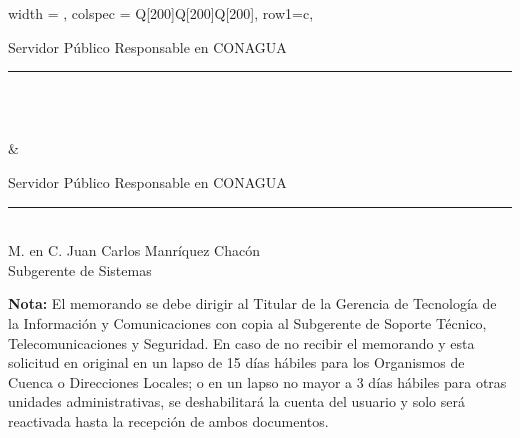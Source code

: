 \documentclass[letterpaper,11pt]{article}
\begin{document}
{
\begin{longtblr}[
	label = none,
	entry = none,
	]{
			width = \linewidth,
			colspec = {Q[200]Q[200]Q[200]},
                                row{1}={c},
		}                                                                                            
		{\footnotesize Servidor Público Responsable en CONAGUA\\[1cm] \rule{5cm}{0.5mm}\\ \footnotesize \NOMBREUSUARIO\\ \footnotesize \PUESTOUSUARIO} & 
                   {\footnotesize Servidor Público Responsable en CONAGUA\\[1cm] \rule{5cm}{0.5mm}\\ \footnotesize M. en C. Juan Carlos Manríquez Chacón\\Subgerente de Sistemas}
	\end{longtblr}
}

{\tiny {\textbf{ Nota:}} El memorando se debe dirigir al Titular de la Gerencia de Tecnología de la Información y Comunicaciones con copia al Subgerente de Soporte Técnico, Telecomunicaciones y Seguridad. En caso de no recibir el memorando y esta solicitud en original en un lapso de 15 días hábiles para los Organismos de Cuenca o Direcciones Locales; o en un lapso no mayor a 3 días hábiles para otras unidades administrativas, se deshabilitará la cuenta del usuario y solo será reactivada hasta la recepción de ambos documentos.}
\end{document}
